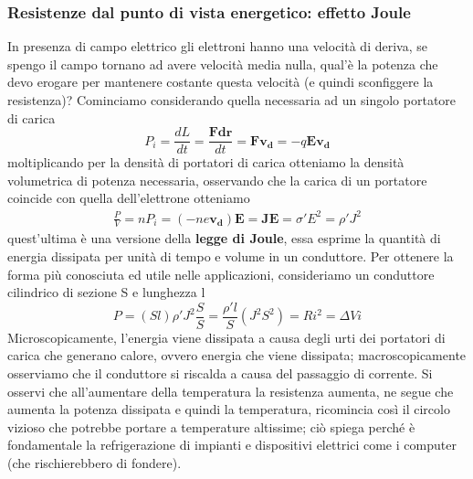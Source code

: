 \documentclass[
10pt, %
a4paper, %
oneside, %
headinclude,footinclude, %
BCOR5mm, %
]{scrartcl}
\begin{document}
\subsubsection*{Resistenze dal punto di vista energetico: effetto Joule}
In presenza di campo elettrico gli elettroni hanno una velocità di deriva, se spengo il campo tornano ad avere velocità media nulla, qual'è la potenza che devo erogare per mantenere costante questa velocità (e quindi sconfiggere la resistenza)? Cominciamo considerando quella necessaria ad un singolo portatore di carica
\[P_i = \frac{dL}{dt}= \frac{\mathbf{F}\mathbf{dr}}{dt}= \mathbf{F}\mathbf{v_d}= -q\mathbf{E}\mathbf{v_d}\] 
moltiplicando per la densità di portatori di carica otteniamo la densità volumetrica di potenza necessaria, osservando che la carica di un portatore coincide con quella dell'elettrone otteniamo
\begin{align}\label{eq:effetto_Joule}
	\frac{P}{V}= nP_i=  (-ne\mathbf{v_d})\mathbf{E}= \mathbf{J}\mathbf{E}= \sigma' E^2= \rho' J^2
\end{align}
quest'ultima è una versione della \textbf{legge di Joule}, essa esprime la quantità di energia dissipata per unità di tempo e volume in un conduttore. Per ottenere la forma più conosciuta ed utile nelle applicazioni, consideriamo un conduttore cilindrico di sezione S e lunghezza l
\[P = (Sl) \rho' J^2 \frac{S}{S} = \frac{\rho' l}{S}(J^2 S^2)= Ri^2= \Delta V i \]
Microscopicamente, l'energia viene dissipata a causa degli urti dei portatori di carica che generano calore, ovvero energia che viene dissipata; macroscopicamente osserviamo che il conduttore si riscalda a causa del passaggio di corrente. Si osservi che all'aumentare della temperatura la resistenza aumenta, ne segue che aumenta la potenza dissipata e quindi la temperatura, ricomincia così il circolo vizioso che potrebbe portare a temperature altissime; ciò spiega perché è fondamentale la refrigerazione di impianti e dispositivi elettrici come i computer (che rischierebbero di fondere).    
\end{document}
